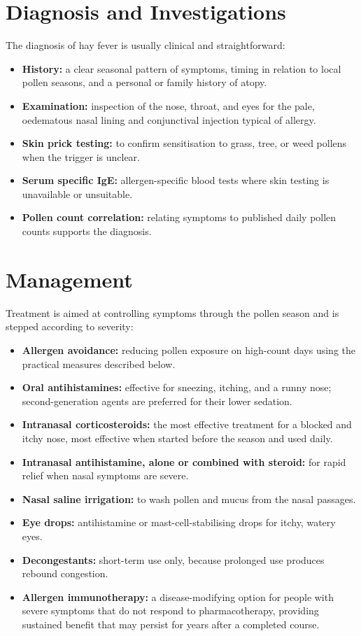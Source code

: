 \section*{Diagnosis and Investigations}
The diagnosis of hay fever is usually clinical and straightforward:

\begin{itemize}
    \item \textbf{History:} a clear seasonal pattern of symptoms, timing in relation to local pollen seasons, and a personal or family history of atopy.
    \item \textbf{Examination:} inspection of the nose, throat, and eyes for the pale, oedematous nasal lining and conjunctival injection typical of allergy.
    \item \textbf{Skin prick testing:} to confirm sensitisation to grass, tree, or weed pollens when the trigger is unclear.
    \item \textbf{Serum specific IgE:} allergen-specific blood tests where skin testing is unavailable or unsuitable.
    \item \textbf{Pollen count correlation:} relating symptoms to published daily pollen counts supports the diagnosis.
\end{itemize}

\section*{Management}
Treatment is aimed at controlling symptoms through the pollen season and is stepped according to severity:

\begin{itemize}
    \item \textbf{Allergen avoidance:} reducing pollen exposure on high-count days using the practical measures described below.
    \item \textbf{Oral antihistamines:} effective for sneezing, itching, and a runny nose; second-generation agents are preferred for their lower sedation.
    \item \textbf{Intranasal corticosteroids:} the most effective treatment for a blocked and itchy nose, most effective when started before the season and used daily.
    \item \textbf{Intranasal antihistamine, alone or combined with steroid:} for rapid relief when nasal symptoms are severe.
    \item \textbf{Nasal saline irrigation:} to wash pollen and mucus from the nasal passages.
    \item \textbf{Eye drops:} antihistamine or mast-cell-stabilising drops for itchy, watery eyes.
    \item \textbf{Decongestants:} short-term use only, because prolonged use produces rebound congestion.
    \item \textbf{Allergen immunotherapy:} a disease-modifying option for people with severe symptoms that do not respond to pharmacotherapy, providing sustained benefit that may persist for years after a completed course.
\end{itemize}

